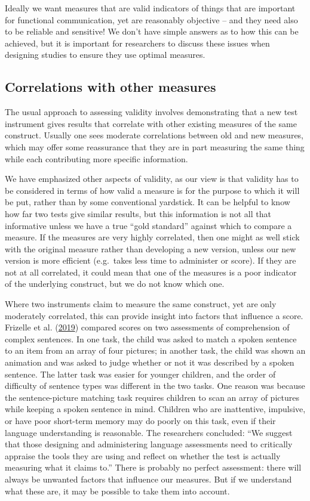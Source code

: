 \documentclass{krantz}
\begin{document}
Ideally we want measures that are valid indicators of things that are important for functional communication, yet are reasonably objective -- and they need also to be reliable and sensitive! We don't have simple answers as to how this can be achieved, but it is important for researchers to discuss these issues when designing studies to ensure they use optimal measures.

\hypertarget{correlations-with-other-measures}{%
\subsection{Correlations with other measures}\label{correlations-with-other-measures}}

The usual approach to assessing validity involves demonstrating that a new test instrument gives results that correlate with other existing measures of the same construct. Usually one sees moderate correlations between old and new measures, which may offer some reassurance that they are in part measuring the same thing while each contributing more specific information.

We have emphasized other aspects of validity, as our view is that validity has to be considered in terms of how valid a measure is for the purpose to which it will be put, rather than by some conventional yardstick. It can be helpful to know how far two tests give similar results, but this information is not all that informative unless we have a true ``gold standard'' against which to compare a measure. If the measures are very highly correlated, then one might as well stick with the original measure rather than developing a new version, unless our new version is more efficient (e.g.~takes less time to administer or score). If they are not at all correlated, it could mean that one of the measures is a poor indicator of the underlying construct, but we do not know which one.

Where two instruments claim to measure the same construct, yet are only moderately correlated, this can provide insight into factors that influence a score. Frizelle et al. (\protect\hyperlink{ref-frizelle2019}{2019}) compared scores on two assessments of comprehension of complex sentences. In one task, the child was asked to match a spoken sentence to an item from an array of four pictures; in another task, the child was shown an animation and was asked to judge whether or not it was described by a spoken sentence. The latter task was easier for younger children, and the order of difficulty of sentence types was different in the two tasks. One reason was because the sentence-picture matching task requires children to scan an array of pictures while keeping a spoken sentence in mind. Children who are inattentive, impulsive, or have poor short-term memory may do poorly on this task, even if their language understanding is reasonable. The researchers concluded: ``We suggest that those designing and administering language assessments need to critically appraise the tools they are using and reflect on whether the test is actually measuring what it claims to.'' There is probably no perfect assessment: there will always be unwanted factors that influence our measures. But if we understand what these are, it may be possible to take them into account.
\end{document}

